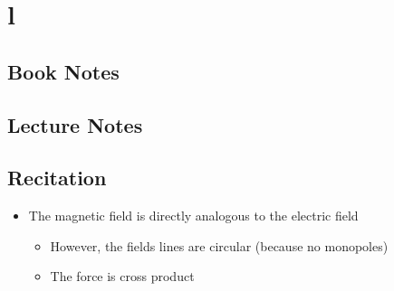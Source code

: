 \documentclass[11pt]{article}
\newcommand{\chapterTitle}{l}
\begin{document}
\section{\chapterTitle}

\subsection{Book Notes}

\subsection{Lecture Notes}

\subsection{Recitation}
\begin{itemize}
    \item The magnetic field is directly analogous to the electric field
    \begin{itemize}
        \item However, the fields lines are circular (because no monopoles)
        \item The force is cross product
    \end{itemize}
\end{itemize}
\end{document}
